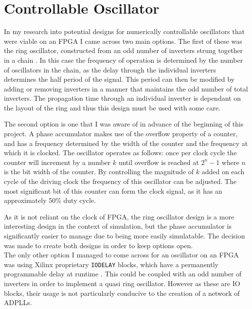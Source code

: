 \documentclass[11pt,english,british]{report}
\begin{document}
\section{Controllable Oscillator}
In my research into potential designs for numerically controllable oscillators that were viable on an FPGA I came across two main options. The first of these was the ring oscillator, constructed from an odd number of inverters strung together in a chain \cite{predraig}. In this case the frequency of operation is determined by the number of oscillators in the chain, as the delay through the individual inverters determines the half period of the signal. This period can then be modified by adding or removing inverters in a manner that maintains the odd number of total inverters. The propagation time through an individual inverter is dependant on the layout of the ring and thus this design must be used with some care.

The second option is one that I was aware of in advance of the beginning of this project. A phase accumulator makes use of the overflow property of a counter, and has a frequency determined by the width of the counter and the frequency at which it is clocked. The oscillator operates as follows: once per clock cycle the counter will increment by a number $k$ until overflow is reached at $2^n-1$ where $n$ is the bit width of the counter. By controlling the magnitude of $k$ added on each cycle of the driving clock the frequency of this oscillator can be adjusted. The most significant bit of this counter can form the clock signal, as it has an approximately 50\% duty cycle.

As it is not reliant on the clock of FPGA, the ring oscillator design is a more interesting design in the context of simulation, but the phase accumulator is significantly easier to manage due to being more easily simulatable. The decision was made to create both designs in order to keep options open.\\
The only other option I managed to come across for an oscillator on an FPGA was using Xilinx proprietary \texttt{IODELAY} blocks, which have a permanently programmable delay at runtime \cite{iodelay}. This could be coupled with an odd number of inverters in order to implement a quasi ring oscillator. However as these are IO blocks, their usage is not particularly conducive to the creation of a network of ADPLLs.
\end{document}

